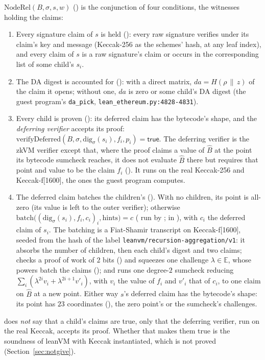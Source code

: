 \documentclass[11pt]{article}
\begin{document}
$\mathrm{NodeRel}(B, \sigma, s, w)$ () is the conjunction of four conditions,
the witnesses holding the claims:
\begin{enumerate}
\item Every signature claim of $s$ is held (): every raw signature verifies
under its claim's key and message (Keccak-256 as the schemes' hash, at any leaf index), and every
claim of $s$ is a raw signature's claim or occurs in the corresponding list of some child's $s_i$.
\item The DA digest is accounted for (): with a direct matrix,
$\mathit{da} = H(\rho \,\|\, z)$ of the claim it opens; without one, $\mathit{da}$ is zero or
some child's DA digest (the guest program's \texttt{da\_pick}, \texttt{lean\_ethereum.py:4828-4831}).
\item Every child is proven (): its deferred claim has the bytecode's shape,
and the \emph{deferring verifier} accepts its proof: $\mathrm{verifyDeferred}(B, \sigma,
\mathrm{dig}_\sigma(s_i), f_i, p_i) = \mathsf{true}$. The deferring verifier is the zkVM verifier
except that, where the proof claims a value of $\widehat{B}$ at the point its bytecode sumcheck
reaches, it does not evaluate $\widehat{B}$ there but requires that point and value to be the claim
$f_i$ (). It runs on the real Keccak-256 and Keccak-f[1600], the ones the guest program
computes.
\item The deferred claim batches the children's (). With no children, its
point is all-zero (its value is left to the outer verifier); otherwise $\mathrm{batch}\big(
(\mathrm{dig}_\sigma(s_i), f_i, c_i)_i, \text{hints}\big) = c$ ( run by
;  in ), with $c_i$ the deferred claim of $s_i$. The
batching is a Fiat-Shamir transcript on Keccak-f[1600], seeded from the hash of the label
\texttt{leanvm/recursion-aggregation/v1}: it absorbs the number of children, then each child's
digest and two claims; checks a proof of work of $2$ bits () and squeezes one challenge $\lambda \in \mathbb{E}$, whose powers batch the
claims (); and runs one degree-$2$ sumcheck reducing
$\sum_i (\lambda^{2i} v_i + \lambda^{2i+1} v'_i)$, with $v_i$
the value of $f_i$ and $v'_i$ that of $c_i$, to one claim on $\widehat{B}$ at a new point.
Either way $s$'s deferred claim has the bytecode's shape: its point has $23$ coordinates
(), the zero point's or the sumcheck's challenges.
\end{enumerate}
 does \emph{not} say that a child's claims are true, only that the deferring verifier,
run on the real Keccak, accepts its proof. Whether that makes them true is the soundness of leanVM
with Keccak instantiated, which is not proved (Section~\ref{sec:notgive}).
\end{document}
